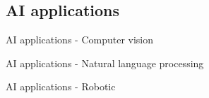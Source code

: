 \subsection{AI applications}

\begin{frame}{AI applications - Computer vision}
    
\end{frame}

\begin{frame}{AI applications - Natural language processing}
    
\end{frame}

\begin{frame}{AI applications - Robotic}
    
\end{frame}
